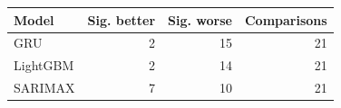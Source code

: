 \begin{tabular}{l rrr}
\toprule
Model & Sig. better & Sig. worse & Comparisons \\
\midrule
GRU & 2 & 15 & 21 \\
LightGBM & 2 & 14 & 21 \\
SARIMAX & 7 & 10 & 21 \\
\bottomrule
\end{tabular}
